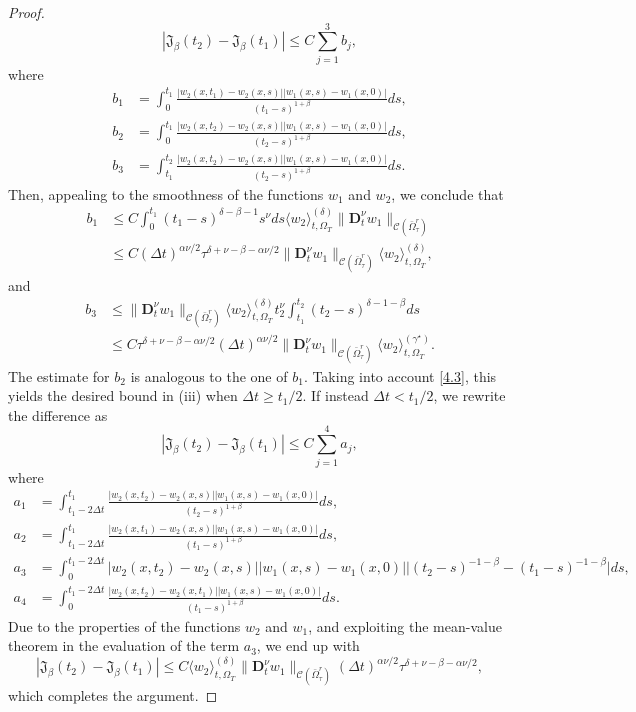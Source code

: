 \documentclass[10pt,a4paper]{amsart}
\def\C {\mathcal{C}}
\begin{document}
\begin{proof}
$$
|\mathfrak{J}_{\beta}(t_2)-\mathfrak{J}_{\beta}(t_1)|\leq C\sum_{j=1}^{3}b_{j},
$$
where
\begin{align*}
b_{1}&=\int_{0}^{t_1}\frac{|w_2(x,t_1)-w_2(x,s)||w_1(x,s)-w_1(x,0)|}{(t_1-s)^{1+\beta}}ds,\\
b_{2}&=\int_{0}^{t_1}\frac{|w_2(x,t_2)-w_2(x,s)||w_1(x,s)-w_1(x,0)|}{(t_2-s)^{1+\beta}}ds,\\
b_{3}&=\int^{t_2}_{t_1}\frac{|w_2(x,t_2)-w_2(x,s)||w_1(x,s)-w_1(x,0)|}{(t_2-s)^{1+\beta}}ds.
\end{align*}
Then, appealing to the smoothness of the functions $w_1$ and $w_2$,
we conclude that
\begin{align*}
b_1&\leq C\int_{0}^{t_1}(t_1-s)^{\delta-\beta-1}s^{\nu}ds\langle w_2\rangle_{t,\Omega_T}^{(\delta)}\|\mathbf{D}^{\nu}_{t}w_1\|_{\C(\bar{\Omega}_{\tau}^{r})}\\
&
\leq C(\Delta t)^{\alpha\nu/2}\tau^{\delta+\nu-\beta-\alpha\nu/2} \|\mathbf{D}^{\nu}_{t}w_1\|_{\C(\bar{\Omega}_{\tau}^{r})}
\langle w_2\rangle_{t,\Omega_T}^{(\delta)},\end{align*}
and
\begin{align*}
b_3&\leq
\|\mathbf{D}^{\nu}_{t}w_1\|_{\C(\bar{\Omega}_{\tau}^{r})}
\langle w_2\rangle_{t,\Omega_T}^{(\delta)} t_{2}^{\nu}\int_{t_1}^{t_2}(t_2-s)^{\delta-1-\beta}ds\\
&
\leq C\tau^{\delta+\nu-\beta-\alpha\nu/2}(\Delta t)^{\alpha\nu/2}
\|\mathbf{D}^{\nu}_{t}w_1\|_{\C(\bar{\Omega}_{\tau}^{r})}
\langle w_2\rangle_{t,\Omega_T}^{(\gamma^{\star})}.
\end{align*}
The estimate for $b_2$ is analogous to the one of $b_1$.
Taking into account \eqref{4.3}, this yields the desired bound in (iii)
when $\Delta t\geq t_1/2$.
If instead $\Delta t<t_1/2$,
we rewrite the difference as
 \begin{equation}\label{4.5}
|\mathfrak{J}_{\beta}(t_2)-\mathfrak{J}_{\beta}(t_1)|\leq C\sum_{j=1}^{4}a_{j},
\end{equation}
where
\begin{align*}
a_{1}&=\int_{t_1-2\Delta t}^{t_1}\frac{|w_2(x,t_2)-w_2(x,s)||w_1(x,s)-w_1(x,0)|}{(t_2-s)^{1+\beta}}ds,\\
a_{2}&=\int_{t_1-2\Delta t}^{t_1}\frac{|w_2(x,t_1)-w_2(x,s)||w_1(x,s)-w_1(x,0)|}{(t_1-s)^{1+\beta}}ds,\\
a_{3}&=\int_{0}^{t_1-2\Delta t}|w_2(x,t_2)-w_2(x,s)||w_1(x,s)-w_1(x,0)|\Big|(t_2-s)^{-1-\beta}-(t_1-s)^{-1-\beta}\Big|ds,\\
a_{4}&=\int^{t_1-2\Delta t}_{0}\frac{|w_2(x,t_2)-w_2(x,t_1)||w_1(x,s)-w_1(x,0)|}{(t_1-s)^{1+\beta}}ds.
\end{align*}
Due to the properties of the functions $w_2$ and $w_1$, and exploiting  the mean-value theorem in the evaluation of  the term $a_3$, we end up with
\[
|\mathfrak{J}_{\beta}(t_2)-\mathfrak{J}_{\beta}(t_1)|\leq C\langle w_2\rangle_{t,\Omega_{T}}^{(\delta)} \|\mathbf{D}_{t}^{\nu}w_1\|_{\C(\bar{\Omega}_{\tau}^{r})}(\Delta t)^{\alpha\nu/2}\tau^{\delta+\nu-\beta-\alpha\nu/2},
\]
which completes the argument.
\end{proof}
\end{document}
